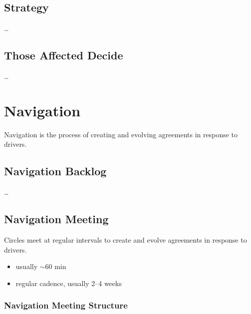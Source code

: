 \section{Strategy}
\label{strategy}

{\ldots}

\section{Those Affected Decide}
\label{thoseaffecteddecide}

{\ldots}

\chapter{Navigation}
\label{navigation}

Navigation is the process of creating and evolving agreements in response to drivers.

\section{Navigation Backlog}
\label{navigationbacklog}

{\ldots}

\section{Navigation Meeting}
\label{navigationmeeting}

Circles meet at regular intervals to create and evolve agreements in response to drivers.

\begin{itemize}
\item usually \ensuremath{\sim}60 min

\item regular cadence, usually 2--4 weeks

\end{itemize}

\subsection{Navigation Meeting Structure}
\label{navigationmeetingstructure}

